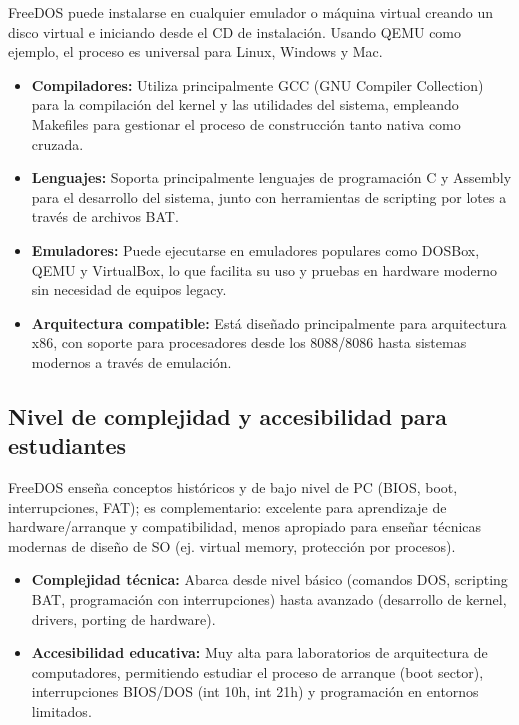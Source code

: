  FreeDOS puede instalarse en cualquier emulador o máquina virtual creando un disco virtual e iniciando desde el CD de instalación. Usando QEMU como ejemplo, el proceso es universal para Linux, Windows y Mac.\citep[pag. 15--17 ]{freedos_using}

\begin{itemize}
    \item \textbf{Compiladores:} Utiliza principalmente GCC (GNU Compiler Collection) para la compilación del kernel y las utilidades del sistema, empleando Makefiles para gestionar el proceso de construcción tanto nativa como cruzada.
    
    \item \textbf{Lenguajes:} Soporta principalmente lenguajes de programación C y Assembly para el desarrollo del sistema, junto con herramientas de scripting por lotes a través de archivos BAT.
    
    \item \textbf{Emuladores:} Puede ejecutarse en emuladores populares como DOSBox, QEMU y VirtualBox, lo que facilita su uso y pruebas en hardware moderno sin necesidad de equipos legacy.
    
    \item \textbf{Arquitectura compatible:} Está diseñado principalmente para arquitectura x86, con soporte para procesadores desde los 8088/8086 hasta sistemas modernos a través de emulación.
\end{itemize}

\subsection{Nivel de complejidad y accesibilidad para estudiantes}
FreeDOS enseña conceptos históricos y de bajo nivel de PC (BIOS, boot, interrupciones, FAT); es complementario: excelente para aprendizaje de hardware/arranque y compatibilidad, menos apropiado para enseñar técnicas modernas de diseño de SO (ej. virtual memory, protección por procesos).\citep{freedos_programs}
\begin{itemize}
    \item \textbf{Complejidad técnica:} Abarca desde nivel básico (comandos DOS, scripting BAT, programación con interrupciones) hasta avanzado (desarrollo de kernel, drivers, porting de hardware).
    
    \item \textbf{Accesibilidad educativa:} Muy alta para laboratorios de arquitectura de computadores, permitiendo estudiar el proceso de arranque (boot sector), interrupciones BIOS/DOS (int 10h, int 21h) y programación en entornos limitados.
\end{itemize}